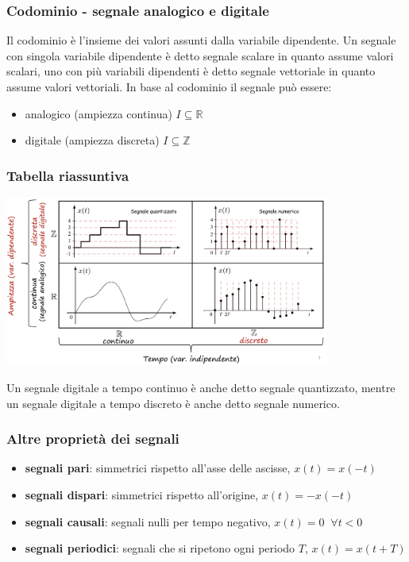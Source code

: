 \subsubsection*{Codominio - segnale analogico e digitale}
Il codominio è l'insieme dei valori assunti dalla variabile dipendente. Un segnale con singola variabile dipendente è detto segnale
scalare in quanto assume valori scalari, uno con più variabili dipendenti è detto segnale vettoriale in quanto assume valori vettoriali.
In base al codominio il segnale può essere:
\begin{itemize}
	\item analogico (ampiezza continua) \(I \subseteq \mathbb{R}\)
	\item digitale (ampiezza discreta) \(I \subseteq \mathbb{Z}\)
\end{itemize}

\subsubsection*{Tabella riassuntiva}
\begin{center}
	\includegraphics[width=0.8\textwidth]{immagini/classificazione segnali.png}
\end{center}
Un segnale digitale a tempo continuo è anche detto segnale quantizzato, mentre un segnale digitale a tempo discreto è anche detto
segnale numerico.

\subsubsection*{Altre proprietà dei segnali}
\begin{itemize}
	\item \textbf{segnali pari}: simmetrici rispetto all'asse delle ascisse, \(x(t) = x(-t)\)
	\item \textbf{segnali dispari}: simmetrici rispetto all'origine, \(x(t) = -x(-t)\)
	\item \textbf{segnali causali}: segnali nulli per tempo negativo, \(x(t) = 0 \;\; \forall t < 0\)
	\item \textbf{segnali periodici}: segnali che si ripetono ogni periodo \(T\), \(x(t) = x(t+T)\)
\end{itemize}

